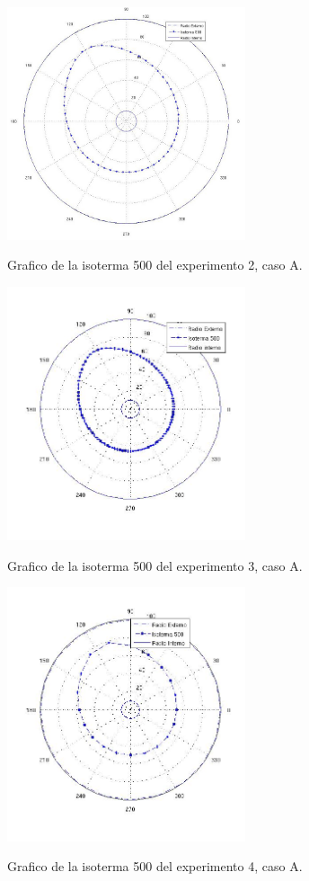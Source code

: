 \documentclass[12pt,a4paper]{article}
\begin{document}
\begin{figure}[h!]
\centering
\caption{Grafico de la isoterma 500 del experimento 2, caso A.}
\includegraphics[width=7cm]{test5050biso.jpg}
\label{Exp2Biso}
\end{figure}

\begin{figure}[h!]
\centering
\caption{Grafico de la isoterma 500 del experimento 3, caso A.}
\includegraphics[width=7cm]{test20100biso.jpg}
\label{Exp3Biso}
\end{figure}

\begin{figure}[h!]
\centering
\caption{Grafico de la isoterma 500 del experimento 4, caso A.}
\includegraphics[width=7cm]{test10020biso.jpg}
\label{Exp4Biso}
\end{figure}
\end{document}
